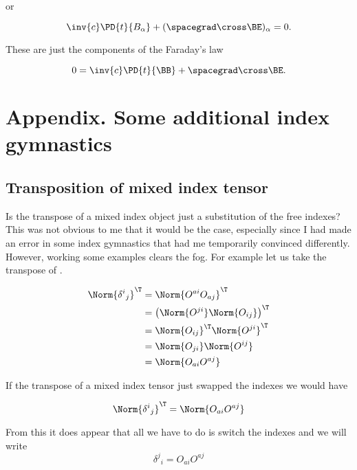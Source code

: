 or

\begin{equation}\label{eqn:relativisticElectrodynamicsL11:1360}
\inv{c} \PD{t}{B_\alpha} + (\spacegrad \cross \BE)_\alpha = 0.
\end{equation}

These are just the components of the Faraday's law

\begin{equation}\label{eqn:relativisticElectrodynamicsL11:930}
0 = \inv{c} \PD{t}{\BB} + \spacegrad \cross \BE.
\end{equation}

\section{Appendix. Some additional index gymnastics}

\subsection{Transposition of mixed index tensor}

Is the transpose of a mixed index object just a substitution of the free indexes?  This was not obvious to me that it would be the case, especially since I had made an error in some index gymnastics that had me temporarily convinced differently.  However, working some examples clears the fog.  For example let us take the transpose of .  

\begin{align*}
\Norm{ {\delta^i}_j }^\T 
&= 
\Norm{ O^{a i} O_{a j} }^\T \\
&= 
\left( \Norm{ O^{j i} } \Norm{ O_{i j} } \right)^\T \\
&=
\Norm{ O_{i j} }^\T
\Norm{ O^{j i} }^\T  \\
&=
\Norm{ O_{j i} }
\Norm{ O^{i j} } \\
&=
\Norm{ O_{a i} O^{a j} } \\
\end{align*}

If the transpose of a mixed index tensor just swapped the indexes we would have

\begin{equation}\label{eqn:relativisticElectrodynamicsL11:1060}
\Norm{ {\delta^i}_j }^\T = \Norm{ O_{a i} O^{a j} } 
\end{equation}

From this it does appear that all we have to do is switch the indexes and we will write
\begin{equation}\label{eqn:relativisticElectrodynamicsL11:1060b}
{\delta^j}_i = O_{a i} O^{a j} 
\end{equation}

